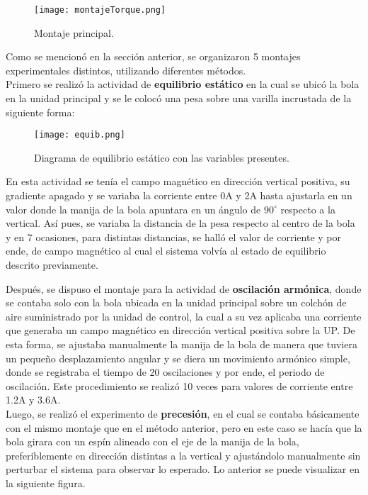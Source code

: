 \documentclass[%
 reprint,
 amsmath,amssymb,
 aps,
]{revtex4-1}
\begin{document}
\begin{figure}[H]
    \centering
    \texttt{[image: montajeTorque.png]}
    \caption{Montaje principal. \cite{guia}}
    \label{fig:grafica1}
\end{figure}

Como se mencionó en la sección anterior, se organizaron 5 montajes experimentales distintos, utilizando diferentes métodos.\\
Primero se realizó la actividad de \textbf{equilibrio estático} en la cual se ubicó la bola en la unidad principal y se le colocó una pesa sobre una varilla incrustada de la siguiente forma:

\begin{figure}[H]
    \centering
    \texttt{[image: equib.png]}
    \caption{Diagrama de equilibrio estático con las variables presentes. \cite{guia}}
    \label{fig:grafica2}
\end{figure}

En esta actividad se tenía el campo magnético en dirección vertical positiva, su gradiente apagado y se variaba la corriente entre 0A y 2A hasta ajustarla en un valor donde la manija de la bola apuntara en un ángulo de $90^{\circ}$ respecto a la vertical. Así pues, se variaba la distancia de la pesa respecto al centro de la bola y en 7 ocasiones, para distintas distancias, se halló el valor de corriente y por ende, de campo magnético al cual el sistema volvía al estado de equilibrio descrito previamente.

Después, se dispuso el montaje para la actividad de \textbf{oscilación armónica}, donde se contaba solo con la bola ubicada en la unidad principal sobre un colchón de aire suministrado por la unidad de control, la cual a su vez aplicaba una corriente que generaba un campo magnético en dirección vertical positiva sobre la UP. De esta forma, se ajustaba manualmente la manija de la bola de manera que tuviera un pequeño desplazamiento angular y se diera un movimiento armónico simple, donde se registraba el tiempo de 20 oscilaciones y por ende, el periodo de oscilación. Este procedimiento se realizó 10 veces para valores de corriente entre 1.2A y 3.6A.\\
Luego, se realizó el experimento de \textbf{precesión}, en el cual se contaba básicamente con el mismo montaje que en el método anterior, pero en este caso se hacía que la bola girara con un espín alineado con el eje de la manija de la bola, preferiblemente en dirección distintas a la vertical y ajustándolo manualmente sin perturbar el sistema para observar lo esperado. Lo anterior se puede visualizar en la siguiente figura.
\end{document}

